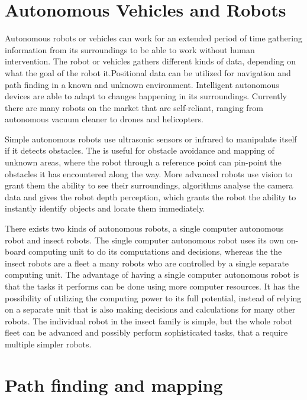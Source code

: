 \clearpage
\section{Autonomous Vehicles and Robots}

Autonomous robots or vehicles can work for an extended period of time gathering information from its surroundings to be able to work without human intervention. The robot or vehicles gathers different kinds of data, depending on what the goal of the robot it.Positional data can be utilized for navigation and path finding in a known and unknown environment. Intelligent autonomous devices are able to adapt to changes happening in its surroundings.
Currently there are many robots on the market that are self-reliant, ranging from autonomous vacuum cleaner to drones and helicopters. \cite{autonomousbasic}

Simple autonomous robots use ultrasonic sensors or infrared to manipulate itself if it detects obstacles. The is useful for obstacle avoidance and mapping of unknown areas, where the robot through a reference point can pin-point the obstacles it has encountered along the way.
More advanced robots use vision to grant them the ability to see their surroundings, algorithms analyse the camera data and gives the robot depth perception, which grants the robot the ability to instantly identify objects and locate them immediately.\cite{obstacles}

There exists two kinds of autonomous robots, a single computer autonomous robot and insect robots. The single computer autonomous robot uses its own on-board computing unit to do its computations and decisions, whereas the the insect robots are a fleet a many robots who are controlled by a single separate computing unit.
The advantage of having a single computer autonomous robot is that the tasks it performs can be done using more computer resources. It has the possibility of utilizing the computing power to its full potential, instead of relying on a separate unit that is also making decisions and calculations for many other robots.
The individual robot in the insect family is simple, but the whole robot fleet can be advanced and possibly perform sophisticated tasks, that a require multiple simpler robots.\cite{singleandinsect}


\clearpage
\section{Path finding and mapping}

